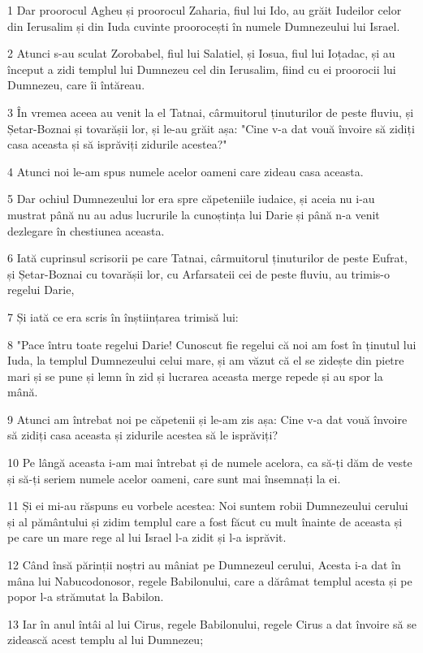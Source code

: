 \par 1 Dar proorocul Agheu și proorocul Zaharia, fiul lui Ido, au grăit Iudeilor celor din Ierusalim și din Iuda cuvinte proorocești în numele Dumnezeului lui Israel.
\par 2 Atunci s-au sculat Zorobabel, fiul lui Salatiel, și Iosua, fiul lui Ioțadac, și au început a zidi templul lui Dumnezeu cel din Ierusalim, fiind cu ei proorocii lui Dumnezeu, care îi întăreau.
\par 3 În vremea aceea au venit la el Tatnai, cârmuitorul ținuturilor de peste fluviu, și Șetar-Boznai și tovarășii lor, și le-au grăit așa: "Cine v-a dat vouă învoire să zidiți casa aceasta și să isprăviți zidurile acestea?"
\par 4 Atunci noi le-am spus numele acelor oameni care zideau casa aceasta.
\par 5 Dar ochiul Dumnezeului lor era spre căpeteniile iudaice, și aceia nu i-au mustrat până nu au adus lucrurile la cunoștința lui Darie și până n-a venit dezlegare în chestiunea aceasta.
\par 6 Iată cuprinsul scrisorii pe care Tatnai, cârmuitorul ținuturilor de peste Eufrat, și Șetar-Boznai cu tovarășii lor, cu Arfarsateii cei de peste fluviu, au trimis-o regelui Darie,
\par 7 Și iată ce era scris în înștiințarea trimisă lui:
\par 8 "Pace întru toate regelui Darie! Cunoscut fie regelui că noi am fost în ținutul lui Iuda, la templul Dumnezeului celui mare, și am văzut că el se zidește din pietre mari și se pune și lemn în zid și lucrarea aceasta merge repede și au spor la mână.
\par 9 Atunci am întrebat noi pe căpetenii și le-am zis așa: Cine v-a dat vouă învoire să zidiți casa aceasta și zidurile acestea să le isprăviți?
\par 10 Pe lângă aceasta i-am mai întrebat și de numele acelora, ca să-ți dăm de veste și să-ți seriem numele acelor oameni, care sunt mai însemnați la ei.
\par 11 Și ei mi-au răspuns eu vorbele acestea: Noi suntem robii Dumnezeului cerului și al pământului și zidim templul care a fost făcut cu mult înainte de aceasta și pe care un mare rege al lui Israel l-a zidit și l-a isprăvit.
\par 12 Când însă părinții noștri au mâniat pe Dumnezeul cerului, Acesta i-a dat în mâna lui Nabucodonosor, regele Babilonului, care a dărâmat templul acesta și pe popor l-a strămutat la Babilon.
\par 13 Iar în anul întâi al lui Cirus, regele Babilonului, regele Cirus a dat învoire să se zidească acest templu al lui Dumnezeu;
